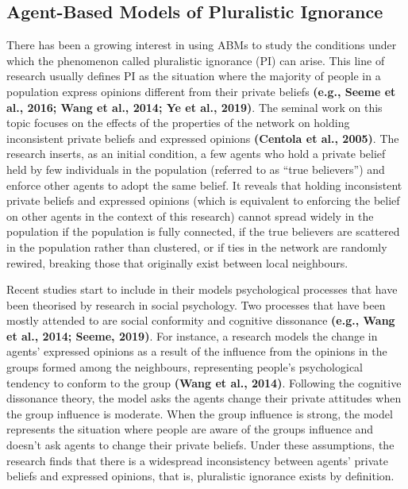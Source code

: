 \documentclass[
  11pt,
]{article}
\begin{document}
\hypertarget{agent-based-models-of-pluralistic-ignorance}{%
\subsection{Agent-Based Models of Pluralistic
Ignorance}\label{agent-based-models-of-pluralistic-ignorance}}

There has been a growing interest in using ABMs to study the conditions
under which the phenomenon called pluralistic ignorance (PI) can arise.
This line of research usually defines PI as the situation where the
majority of people in a population express opinions different from their
private beliefs \textbf{(e.g., Seeme et al., 2016; Wang et al., 2014; Ye
et al., 2019)}. The seminal work on this topic focuses on the effects of
the properties of the network on holding inconsistent private beliefs
and expressed opinions \textbf{(Centola et al., 2005)}. The research
inserts, as an initial condition, a few agents who hold a private belief
held by few individuals in the population (referred to as ``true
believers'') and enforce other agents to adopt the same belief. It
reveals that holding inconsistent private beliefs and expressed opinions
(which is equivalent to enforcing the belief on other agents in the
context of this research) cannot spread widely in the population if the
population is fully connected, if the true believers are scattered in
the population rather than clustered, or if ties in the network are
randomly rewired, breaking those that originally exist between local
neighbours.

Recent studies start to include in their models psychological processes
that have been theorised by research in social psychology. Two processes
that have been mostly attended to are social conformity and cognitive
dissonance \textbf{(e.g., Wang et al., 2014; Seeme, 2019)}. For
instance, a research models the change in agents' expressed opinions as
a result of the influence from the opinions in the groups formed among
the neighbours, representing people's psychological tendency to conform
to the group \textbf{(Wang et al., 2014)}. Following the cognitive
dissonance theory, the model asks the agents change their private
attitudes when the group influence is moderate. When the group influence
is strong, the model represents the situation where people are aware of
the groups influence and doesn't ask agents to change their private
beliefs. Under these assumptions, the research finds that there is a
widespread inconsistency between agents' private beliefs and expressed
opinions, that is, pluralistic ignorance exists by definition.
\end{document}
